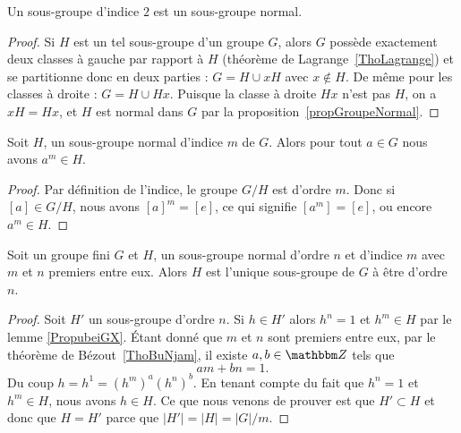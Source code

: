 \begin{lemma}    \label{LemSkIOOG}
    Un sous-groupe d'indice \( 2\) est un sous-groupe normal.
\end{lemma}

\begin{proof}
    Si $H$ est un tel sous-groupe d'un groupe $G$, alors $G$ possède exactement deux classes à gauche par rapport à \( H\) (théorème de Lagrange~\ref{ThoLagrange}) et se partitionne donc en deux parties : \( G=H\cup xH\) avec \( x \notin H \). De même pour les classes à droite : \( G=H\cup Hx\). Puisque la classe à droite \( Hx \) n'est pas $H$, on a \( xH = Hx \), et $H$ est normal dans $G$ par la proposition~\ref{propGroupeNormal}.
\end{proof}

\begin{lemma}\label{PropubeiGX}
    Soit \( H\), un sous-groupe normal d'indice \( m\) de \( G\). Alors pour tout \( a\in G\) nous avons \( a^m\in H\).
\end{lemma}

\begin{proof}
    Par définition de l'indice, le groupe \( G/H\) est d'ordre \( m\). Donc si \( [a]\in G/H\), nous avons \( [a]^m=[e]\), ce qui signifie \( [a^m]=[e]\), ou encore \( a^m\in H\).
\end{proof}


\begin{proposition}     \label{PROPooVWVIooQzuAlA}
    Soit un groupe fini \( G\) et \( H\), un sous-groupe normal d'ordre \( n\) et d'indice \( m\) avec \( m\) et \( n\) premiers entre eux. Alors \( H\) est l'unique sous-groupe de \( G\) à être d'ordre \( n\).
\end{proposition}

\begin{proof}
    Soit \( H'\) un sous-groupe d'ordre \( n\). Si \( h\in H'\) alors \( h^n=1\) et \( h^m\in H\) par le lemme \ref{PropubeiGX}. Étant donné que \( m\) et \( n\) sont premiers entre eux, par le théorème de Bézout~\ref{ThoBuNjam}, il existe \( a,b\in \eZ\) tels que
    \begin{equation}
        am+bn=1.
    \end{equation}
    Du coup \( h=h^1=(h^m)^a(h^n)^b\). En tenant compte du fait que \( h^n=1\) et \( h^m\in H\), nous avons \( h\in H\). Ce que nous venons de prouver est que \( H'\subset H\) et donc que \( H=H'\) parce que \( | H' |=| H |=| G |/m\).
\end{proof}

